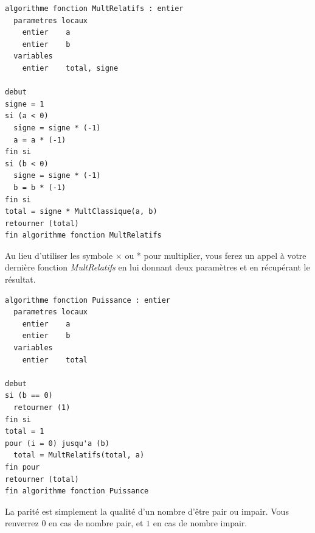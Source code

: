 \documentclass[11pt,a4paper]{article}
\begin{document}
\bigskip


\begin{table}[ht!]
  \centering
\begin{lstlisting}[style=algorithmique]
algorithme fonction MultRelatifs : entier
  parametres locaux
    entier    a
    entier    b
  variables
    entier    total, signe

debut
signe = 1
si (a < 0)
  signe = signe * (-1)
  a = a * (-1)
fin si
si (b < 0)
  signe = signe * (-1)
  b = b * (-1)
fin si
total = signe * MultClassique(a, b)
retourner (total)
fin algorithme fonction MultRelatifs \end{lstlisting}
\end{table}


\vfillLast

\newpage

\vfillFirst



Au lieu d'utiliser les symbole × ou * pour multiplier, vous ferez un appel à votre dernière fonction \textit{MultRelatifs} en lui donnant deux paramètres et en récupérant le résultat.

\bigskip


\begin{table}[ht!]
  \centering
\begin{lstlisting}[style=algorithmique]
algorithme fonction Puissance : entier
  parametres locaux
    entier    a
    entier    b
  variables
    entier    total

debut
si (b == 0)
  retourner (1)
fin si
total = 1
pour (i = 0) jusqu'a (b)
  total = MultRelatifs(total, a)
fin pour
retourner (total)
fin algorithme fonction Puissance \end{lstlisting}
\end{table}





La parité est simplement la qualité d'un nombre d'être pair ou impair.
Vous renverrez $ 0 $ en cas de nombre pair, et $ 1 $ en cas de nombre impair.
\end{document}
